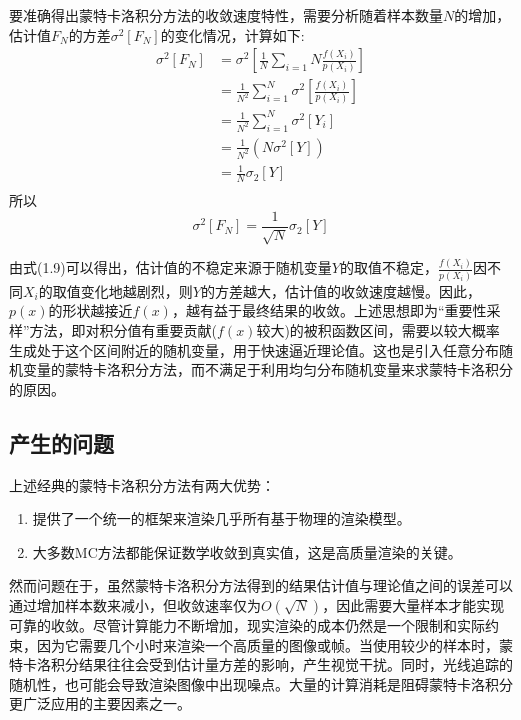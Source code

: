 \documentclass[lang=cn,10pt]{elegantbook}
\begin{document}
\begin{enumerate}[itemsep=1.5ex]
\vspace{12pt}
\quad 要准确得出蒙特卡洛积分方法的收敛速度特性，需要分析随着样本数量$N$的增加，估计值$F_N$的方差$\sigma^2[F_N]$的变化情况，计算如下\cite{cnblog:timeflow1024}:
\begin{align*}\label{eu_eqn}
\sigma^2[F_N] & =\sigma^2[\frac{1}{N}\sum_{i=1}{N}\frac{f(X_i)}{p(X_i)}]\\
&= \frac{1}{N^2}\sum_{i=1}^{N}\sigma^2[\frac{f(X_i)}{p(X_i)}]\\
&= \frac{1}{N^2}\sum_{i=1}^{N}\sigma^2[Y_i]\\
&= \frac{1}{N^2}(N\sigma^2[Y])\\
&= \frac{1}{N}\sigma_2[Y]\\
\end{align*}
所以
\begin{equation}\label{eu_eqn}
\sigma^2[F_N]=\frac{1}{\sqrt{N}}\sigma_2[Y]
\end{equation}

\quad 由式(1.9)可以得出，估计值的不稳定来源于随机变量$Y$的取值不稳定，$\frac{f(X_i)}{p(X_i)}$因不同$X_i$的取值变化地越剧烈，则$Y$的方差越大，估计值的收敛速度越慢。因此，$p(x)$的形状越接近$f(x)$，越有益于最终结果的收敛。上述思想即为“重要性采样”方法，即对积分值有重要贡献($f(x)$较大)的被积函数区间，需要以较大概率生成处于这个区间附近的随机变量，用于快速逼近理论值。这也是引入任意分布随机变量的蒙特卡洛积分方法，而不满足于利用均匀分布随机变量来求蒙特卡洛积分的原因。
\end{enumerate}

\subsection{产生的问题}
上述经典的蒙特卡洛积分方法有两大优势：
\begin{enumerate}
\item 提供了一个统一的框架来渲染几乎所有基于物理的渲染模型。
\item 大多数MC方法都能保证数学收敛到真实值，这是高质量渲染的关键。
\end{enumerate}

然而问题在于，虽然蒙特卡洛积分方法得到的结果估计值与理论值之间的误差可以通过增加样本数来减小，但收敛速率仅为$O(\sqrt{N})$，因此需要大量样本才能实现可靠的收敛。尽管计算能力不断增加，现实渲染的成本仍然是一个限制和实际约束，因为它需要几个小时来渲染一个高质量的图像或帧。当使用较少的样本时，蒙特卡洛积分结果往往会受到估计量方差的影响，产生视觉干扰。同时，光线追踪的随机性，也可能会导致渲染图像中出现噪点。大量的计算消耗是阻碍蒙特卡洛积分更广泛应用的主要因素之一。
\end{document}
